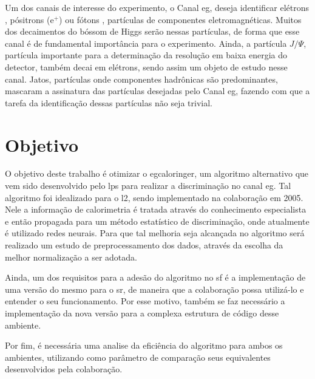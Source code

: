 Um dos canais de interesse do experimento, o Canal \acrshort{eg},
deseja identificar elétrons , pósitrons (e$^+$)
ou fótons , 
partículas de componentes eletromagnéticas. Muitos dos decaimentos do bóssom de
Higgs serão nessas partículas, de forma que esse canal é de fundamental
importância para o experimento. Ainda, a partícula $J/\Psi$, partícula importante
para a determinação da resolução em baixa energia do detector, 
também decai em elétrons, sendo assim um objeto de estudo nesse canal.
Jatos, partículas onde componentes hadrônicas são predominantes, 
mascaram a assinatura das partículas desejadas pelo Canal \acrshort{eg}, fazendo 
com que a tarefa da identificação dessas partículas não seja trivial.

\section{Objetivo} %

O objetivo deste trabalho é otimizar o \gls{egcaloringer},
um algoritmo alternativo que vem sido desenvolvido pelo \gls{lps}
para realizar a discriminação 
no canal \acrshort{eg}. Tal algoritmo foi idealizado para o \gls{l2}, 
sendo implementado na colaboração em 2005.
Nele a informação de calorimetria é tratada através do conhecimento especialista
e então propagada para um método estatístico 
de discriminação, onde atualmente é utilizado redes neurais. 
Para que tal melhoria seja alcançada no
algoritmo será realizado um estudo de preprocessamento dos dados,
através da escolha da melhor normalização a ser adotada.

Ainda, um dos requisitos para a adesão do algoritmo no \glsdesc{sf} é a
implementação de uma versão do mesmo para o \glsdesc{sr},
de maneira  que a colaboração possa utilizá-lo e entender o seu
funcionamento. Por esse motivo, também se faz necessário a implementação 
da nova versão para a complexa estrutura de código desse ambiente.

Por fim, é necessária uma analise da eficiência do algoritmo para ambos os
ambientes, utilizando como parâmetro de comparação seus equivalentes 
desenvolvidos pela colaboração.

